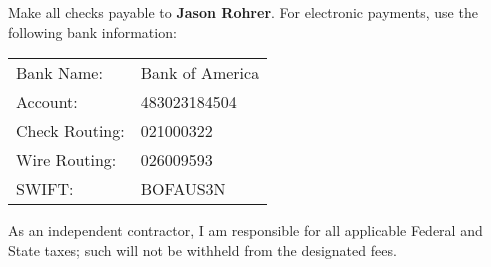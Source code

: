 \documentclass[12pt]{article}
\begin{document}
\vspace{0.5in}

Make all checks payable to {\bf Jason Rohrer}.  For electronic payments, use the following bank information:

\begin{center}
\begin{tabular}{ll}
Bank Name: &Bank of America\\
Account: &483023184504\\
Check Routing: &021000322\\
Wire Routing: &026009593\\
SWIFT: &BOFAUS3N
\end{tabular}
\end{center}


As an independent contractor, I am responsible for all applicable Federal and State taxes;  such will not be withheld from the designated fees.
\end{document}
